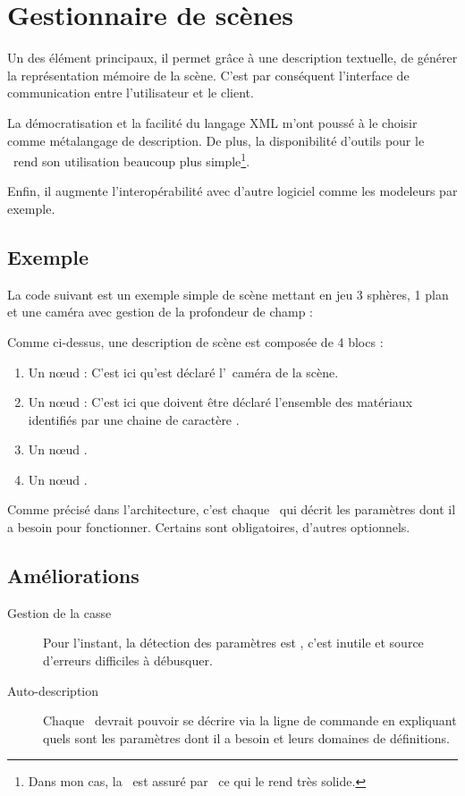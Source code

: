 \section{Gestionnaire de scènes\label{scenemanager}}
Un des élément principaux, il permet grâce à une description textuelle, de
générer la représentation mémoire de la scène. C'est par conséquent
l'interface de communication entre l'utilisateur et le client.

La démocratisation et la facilité du langage XML m'ont poussé à le choisir
comme métalangage de description. De plus, la disponibilité d'outils pour le
\ rend son utilisation beaucoup plus simple\footnote{Dans mon cas,
la \ est assuré par \ ce qui le rend très solide.}.

Enfin, il augmente l'interopérabilité avec d'autre logiciel comme les
modeleurs par exemple.

\subsection{Exemple} 
La code suivant est un exemple simple de scène mettant en jeu 3 sphères, 1 plan
et une caméra avec gestion de la profondeur de champ :


Comme ci-dessus, une description de scène est composée de 4 blocs :
\begin{enumerate}
  \item Un nœud  : C'est ici qu'est déclaré l'\ caméra
  de la scène.
  \item Un nœud  : C'est ici que doivent être déclaré l'ensemble
  des matériaux identifiés par une chaine de caractère .
  \item Un nœud .
  \item Un nœud .
\end{enumerate}
\vspace*{1em}

Comme précisé dans l'architecture, c'est chaque \ qui décrit les
paramètres dont il a besoin pour fonctionner. Certains sont obligatoires,
d'autres optionnels.

\subsection{Améliorations}
\begin{description}
  \item [Gestion de la casse] Pour l'instant, la détection des paramètres est
    , c'est inutile et source d'erreurs difficiles à
    débusquer.
\item [Auto-description] Chaque \ devrait pouvoir se décrire via
  la ligne de commande en expliquant quels sont les paramètres dont il a
  besoin et leurs domaines de définitions.
\end{description}

